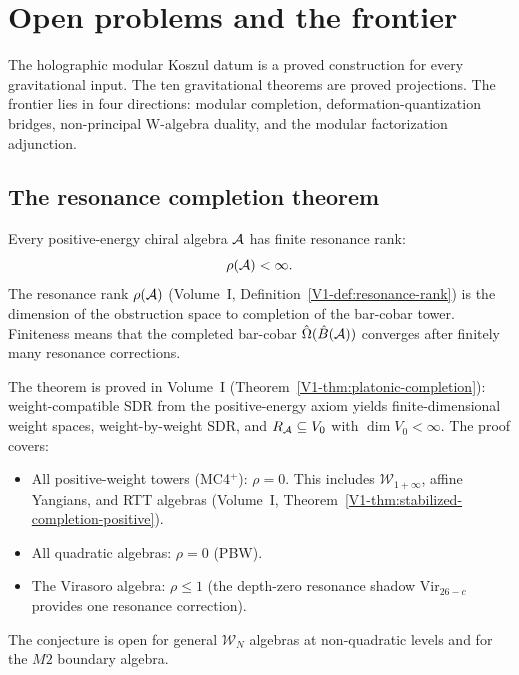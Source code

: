 %
%

\section{Open problems and the frontier}

The holographic modular Koszul datum is a proved construction for
every gravitational input. The ten gravitational theorems are
proved projections. The frontier lies in four directions:
modular completion, deformation-quantization bridges, non-principal
W-algebra duality, and the modular factorization adjunction.

\subsection{The resonance completion theorem}

\begin{theorem}
Every positive-energy chiral algebra $\mathcal{A}$ has finite resonance rank:
\begin{equation}%
\rho(\cA) < \infty.
\end{equation}
The resonance rank $\rho(\mathcal{A})$
(Volume~I, Definition~\ref{V1-def:resonance-rank}) is the dimension of
the obstruction space to completion of the bar-cobar tower. Finiteness
means that the completed bar-cobar
$\hat\Omega(\hat B(\mathcal{A}))$ converges after finitely many resonance
corrections.
\end{theorem}

\begin{remark}
The theorem is proved in Volume~I
(Theorem~\ref{V1-thm:platonic-completion}):
weight-compatible SDR from the positive-energy axiom yields
finite-dimensional weight spaces, weight-by-weight SDR,
and $R_{\mathcal{A}} \subseteq V_0$ with $\dim V_0 < \infty$.
The proof covers:
\begin{itemize}
\item All positive-weight towers (MC4$^+$): $\rho = 0$.
 This includes $\mathcal{W}_{1+\infty}$, affine Yangians,
 and RTT algebras (Volume~I, Theorem~\ref{V1-thm:stabilized-completion-positive}).
\item All quadratic algebras: $\rho = 0$ (PBW).
\item The Virasoro algebra: $\rho \le 1$ (the depth-zero resonance
 shadow $\mathrm{Vir}_{26-c}$ provides one resonance correction).
\end{itemize}
The conjecture is open for general $\mathcal{W}_N$ algebras at
non-quadratic levels and for the $M2$ boundary algebra.
\end{remark}


